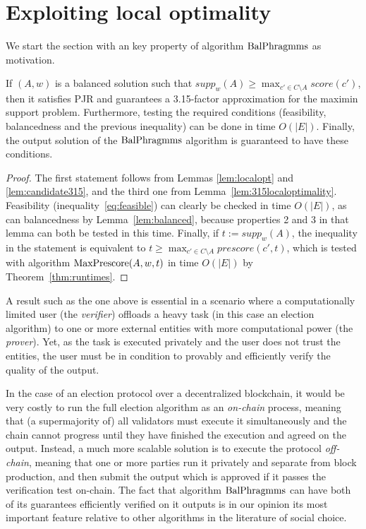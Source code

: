 \section{Exploiting local optimality}\label{s:local}

We start the section with an key property of algorithm $\operatorname{BalPhragmms}$ as motivation.

\begin{theorem}\label{thm:315guarantee}
If $(A,w)$ is a balanced solution such that $supp_w(A)\geq \max_{c'\in C\setminus A} score(c')$, then it satisfies PJR and guarantees a 3.15-factor approximation for the maximin support problem. 
Furthermore, testing the required conditions (feasibility, balancedness and the previous inequality) can be done in time $O(|E|)$. 
Finally, the output solution of the $\operatorname{BalPhragmms}$ algorithm is guaranteed to have these conditions.
\end{theorem}
\begin{proof}
The first statement follows from Lemmas \ref{lem:localopt} and \ref{lem:candidate315}, and the third one from Lemma~\ref{lem:315localoptimality}. 
Feasibility (inequality~\ref{eq:feasible}) can clearly be checked in time $O(|E|)$, as can balancedness by Lemma~\ref{lem:balanced}, because properties 2 and 3 in that lemma can both be tested in this time. 
Finally, if $t:=supp_w(A)$, the inequality in the statement is equivalent to $t\geq \max_{c'\in C\setminus A} prescore(c',t)$, which is tested with algorithm $\operatorname{MaxPrescore}(A,w,t)$ in time $O(|E|)$ by Theorem~\ref{thm:runtimes}.
\end{proof}

A result such as the one above is essential in a scenario where a computationally limited user (the \emph{verifier}) offloads a heavy task (in this case an election algorithm) to one or more external entities with more computational power (the \emph{prover}). Yet, as the task is executed privately and the user does not trust the entities, the user must be in condition to provably and efficiently verify the quality of the output.


In the case of an election protocol over a decentralized blockchain, it would be very costly to run the full election algorithm as an \emph{on-chain} process, meaning that (a supermajority of) all validators must execute it simultaneously and the chain cannot progress until they have finished the execution and agreed on the output. 
Instead, a much more scalable solution is to execute the protocol \emph{off-chain}, meaning that one or more parties run it privately and separate from block production, and then submit the output which is approved if it passes the verification test on-chain. 
The fact that algorithm $\operatorname{BalPhragmms}$ can have both of its guarantees efficiently verified on it outputs is in our opinion its most important feature relative to other algorithms in the literature of social choice. 

